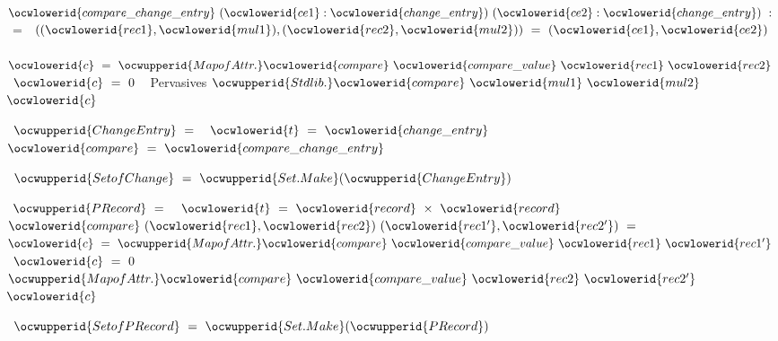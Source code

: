 \documentclass[12pt]{article}
\begin{document}
\label{rellens_types.ml:3833}%
\ocwindent{0.00em}
~$\ocwlowerid{compare\_change\_entry}~(\ocwlowerid{ce1}:\ocwlowerid{change\_entry})~(\ocwlowerid{ce2}:\ocwlowerid{change\_entry})~:~$~=\ocweol
\ocwindent{2.00em}
~$((\ocwlowerid{rec1},\ocwlowerid{mul1}),(\ocwlowerid{rec2},\ocwlowerid{mul2}))~=~(\ocwlowerid{ce1},\ocwlowerid{ce2})~$\ocweol
\ocwindent{2.00em}
~$\ocwlowerid{c}~=~\ocwupperid{MapofAttr.}\ocwlowerid{compare}~\ocwlowerid{compare\_value}~\ocwlowerid{rec1}~\ocwlowerid{rec2}~$\ocweol
\ocwindent{2.00em}
~$\ocwlowerid{c}~=~0$\ocweol
\ocwindent{2.00em}
~\ocwbc{} Pervasives \ocwec{}$\ocwupperid{Stdlib.}\ocwlowerid{compare}~\ocwlowerid{mul1}~\ocwlowerid{mul2}~$\ocweol
\ocwindent{2.00em}
~$\ocwlowerid{c}$\medskip

\label{rellens_types.ml:4086}%
\ocwindent{0.00em}
~$\ocwupperid{ChangeEntry}~=~$\ocweol
\ocwindent{1.00em}
~$\ocwlowerid{t}~=~\ocwlowerid{change\_entry}$\ocweol
\ocwindent{1.00em}
~$\ocwlowerid{compare}~=~\ocwlowerid{compare\_change\_entry}$\ocweol
\ocwindent{0.00em}
\medskip

\label{rellens_types.ml:4180}%
\ocwindent{0.00em}
~$\ocwupperid{SetofChange}~=~\ocwupperid{Set.Make}(\ocwupperid{ChangeEntry})$\medskip

\label{rellens_types.ml:4224}%
\ocwindent{0.00em}
~$\ocwupperid{PRecord}~=~$\ocweol
\ocwindent{1.50em}
~$\ocwlowerid{t}~=~\ocwlowerid{record}~\times{}~\ocwlowerid{record}$\ocweol
\ocwindent{1.00em}
~$\ocwlowerid{compare}~(\ocwlowerid{rec1},\ocwlowerid{rec2})~(\ocwlowerid{rec1'},\ocwlowerid{rec2'})~=~$\ocweol
\ocwindent{2.00em}
~$\ocwlowerid{c}~=~\ocwupperid{MapofAttr.}\ocwlowerid{compare}~\ocwlowerid{compare\_value}~\ocwlowerid{rec1}~\ocwlowerid{rec1'}~$\ocweol
\ocwindent{2.00em}
~$\ocwlowerid{c}~=~0$\ocweol
\ocwindent{2.00em}
~$\ocwupperid{MapofAttr.}\ocwlowerid{compare}~\ocwlowerid{compare\_value}~\ocwlowerid{rec2}~\ocwlowerid{rec2'}~$\ocweol
\ocwindent{2.00em}
~$\ocwlowerid{c}$\ocweol
\ocwindent{0.00em}
\medskip

\label{rellens_types.ml:4460}%
\ocwindent{0.00em}
~$\ocwupperid{SetofPRecord}~=~\ocwupperid{Set.Make}(\ocwupperid{PRecord})$\medskip
\end{document}

